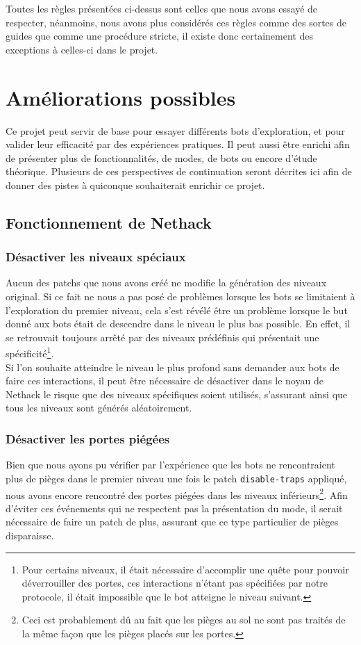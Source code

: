 \documentclass[a4paper,12pt]{article}
\begin{document}
Toutes les règles présentées ci-dessus sont celles que nous avons essayé de
respecter, néanmoins, nous avons plus considérés ces règles comme des sortes de
guides que comme une procédure stricte, il existe donc certainement des
exceptions à celles-ci dans le projet.

\section{Améliorations possibles}
Ce projet peut servir de base pour essayer différents bots d'exploration,
et pour valider leur efficacité par des expériences pratiques. Il peut aussi
être enrichi afin de présenter plus de fonctionnalités, de modes, de bots ou
encore d'étude théorique. Plusieurs de ces perspectives de continuation seront
décrites ici afin de donner des pistes à quiconque souhaiterait enrichir ce
projet.

\subsection{Fonctionnement de Nethack}
\subsubsection{Désactiver les niveaux spéciaux}
Aucun des patchs que nous avons créé ne modifie la génération des niveaux
original. Si ce fait ne nous a pas posé de problèmes lorsque les bots se
limitaient à l'exploration du premier niveau, cela s'est révélé être un problème
lorsque le but donné aux bots était de descendre dans le niveau le plus bas
possible. En effet, il se retrouvait toujours arrêté par des niveaux prédéfinis
qui présentait une spécificité\footnote{Pour certains niveaux, il était
nécessaire d'accomplir une quête pour pouvoir déverrouiller des portes, ces
interactions n'étant pas spécifiées par notre protocole, il était impossible que
le bot atteigne le niveau suivant.}.
\\
Si l'on souhaite atteindre le niveau le plus profond sans demander aux bots de
faire ces interactions, il peut être nécessaire de désactiver dans le noyau de
Nethack le risque que des niveaux spécifiques soient utilisés, s'assurant ainsi
que tous les niveaux sont générés aléatoirement.

\subsubsection{Désactiver les portes piégées}
Bien que nous ayons pu vérifier par l'expérience que les bots ne rencontraient
plus de pièges dans le premier niveau une fois le patch {\verb|disable-traps|}
appliqué, nous avons encore rencontré des portes piégées dans les niveaux
inférieurs\footnote{Ceci est probablement dû au fait que les pièges au sol ne
sont pas traités de la même façon que les pièges placés sur les portes.}. Afin
d'éviter ces événements qui ne respectent pas la présentation du mode, il serait
nécessaire de faire un patch de plus, assurant que ce type particulier de pièges
disparaisse.
\end{document}
